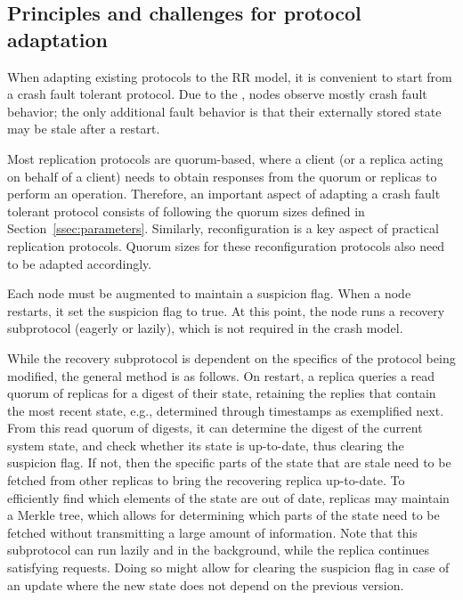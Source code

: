 \subsection{Principles and challenges for protocol adaptation}

When adapting existing protocols to the \ac{RR} model, it is
convenient to start from a crash fault tolerant protocol.
Due to the , nodes observe mostly crash fault behavior; the only
additional fault behavior is that their externally stored state
may be stale after a restart.

Most replication protocols are quorum-based, where a client (or a
replica acting on behalf of a client) needs to obtain responses
from the quorum or replicas to perform an operation.  Therefore,
an important aspect of adapting a crash fault tolerant protocol
consists of following the quorum sizes defined in
Section~\ref{ssec:parameters}. Similarly, reconfiguration is a
key aspect of practical replication protocols. Quorum sizes for
these reconfiguration protocols also need to be adapted
accordingly.

Each node must be augmented to maintain a suspicion flag. When a node
restarts, it set the suspicion flag to true. At this point, the node
runs a recovery subprotocol (eagerly or lazily), which is not required
in the crash model.

While the recovery subprotocol is dependent on the specifics of
the protocol being modified, the general method is as follows. On
restart, a replica queries a read quorum of replicas for a digest
of their state, retaining the replies that contain the most
recent state, e.g., determined through timestamps as exemplified
next.  From this read quorum of digests, it can determine the
digest of the current system state, and check whether its state
is up-to-date, thus clearing the suspicion flag. If not, then the
specific parts of the state that are stale need to be fetched
from other replicas to bring the recovering replica up-to-date.
To efficiently find which elements of the state are out of date,
replicas may maintain a Merkle tree, which allows for determining
which parts of the state need to be fetched without transmitting
a large amount of information. Note that this subprotocol can run
lazily and in the background, while the replica continues
satisfying requests. Doing so might allow for clearing the
suspicion flag in case of an update where the new state does not
depend on the previous version.

